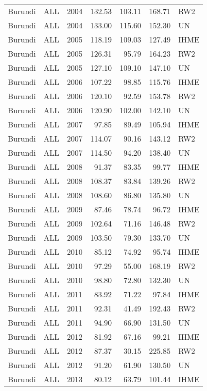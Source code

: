 \begin{longtable}{lllrrrl}
  Burundi & ALL & 2004 & 132.53 & 103.11 & 168.71 & RW2 \\ 
  Burundi & ALL & 2004 & 133.00 & 115.60 & 152.30 & UN \\ 
  Burundi & ALL & 2005 & 118.19 & 109.03 & 127.49 & IHME \\ 
  Burundi & ALL & 2005 & 126.31 & 95.79 & 164.23 & RW2 \\ 
  Burundi & ALL & 2005 & 127.10 & 109.10 & 147.10 & UN \\ 
  Burundi & ALL & 2006 & 107.22 & 98.85 & 115.76 & IHME \\ 
  Burundi & ALL & 2006 & 120.10 & 92.59 & 153.78 & RW2 \\ 
  Burundi & ALL & 2006 & 120.90 & 102.00 & 142.10 & UN \\ 
  Burundi & ALL & 2007 & 97.85 & 89.49 & 105.94 & IHME \\ 
  Burundi & ALL & 2007 & 114.07 & 90.16 & 143.12 & RW2 \\ 
  Burundi & ALL & 2007 & 114.50 & 94.20 & 138.40 & UN \\ 
  Burundi & ALL & 2008 & 91.37 & 83.35 & 99.77 & IHME \\ 
  Burundi & ALL & 2008 & 108.37 & 83.84 & 139.26 & RW2 \\ 
  Burundi & ALL & 2008 & 108.60 & 86.80 & 135.80 & UN \\ 
  Burundi & ALL & 2009 & 87.46 & 78.74 & 96.72 & IHME \\ 
  Burundi & ALL & 2009 & 102.64 & 71.16 & 146.48 & RW2 \\ 
  Burundi & ALL & 2009 & 103.50 & 79.30 & 133.70 & UN \\ 
  Burundi & ALL & 2010 & 85.12 & 74.92 & 95.74 & IHME \\ 
  Burundi & ALL & 2010 & 97.29 & 55.00 & 168.19 & RW2 \\ 
  Burundi & ALL & 2010 & 98.80 & 72.80 & 132.30 & UN \\ 
  Burundi & ALL & 2011 & 83.92 & 71.22 & 97.84 & IHME \\ 
  Burundi & ALL & 2011 & 92.31 & 41.49 & 192.43 & RW2 \\ 
  Burundi & ALL & 2011 & 94.90 & 66.90 & 131.50 & UN \\ 
  Burundi & ALL & 2012 & 81.92 & 67.16 & 99.21 & IHME \\ 
  Burundi & ALL & 2012 & 87.37 & 30.15 & 225.85 & RW2 \\ 
  Burundi & ALL & 2012 & 91.20 & 61.90 & 130.50 & UN \\ 
  Burundi & ALL & 2013 & 80.12 & 63.79 & 101.44 & IHME \\ 

\end{longtable}
